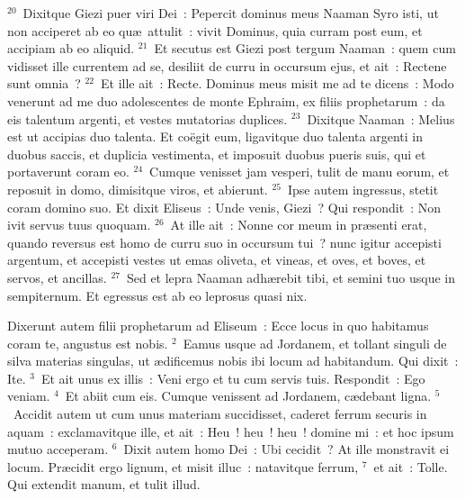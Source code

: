 ${}^{20}$~Dixitque Giezi puer viri Dei~: Pepercit dominus meus Naaman Syro isti, ut non acciperet ab eo qu\ae\ attulit~: vivit Dominus, quia curram post eum, et accipiam ab eo aliquid.
${}^{21}$~Et secutus est Giezi post tergum Naaman~: quem cum vidisset ille currentem ad se, desiliit de curru in occursum ejus, et ait~: Rectene sunt omnia~?
${}^{22}$~Et ille ait~: Recte. Dominus meus misit me ad te dicens~: Modo venerunt ad me duo adolescentes de monte Ephraim, ex filiis prophetarum~: da eis talentum argenti, et vestes mutatorias duplices.
${}^{23}$~Dixitque Naaman~: Melius est ut accipias duo talenta. Et co\"egit eum, ligavitque duo talenta argenti in duobus saccis, et duplicia vestimenta, et imposuit duobus pueris suis, qui et portaverunt coram eo.
${}^{24}$~Cumque venisset jam vesperi, tulit de manu eorum, et reposuit in domo, dimisitque viros, et abierunt.
${}^{25}$~Ipse autem ingressus, stetit coram domino suo. Et dixit Eliseus~: Unde venis, Giezi~? Qui respondit~: Non ivit servus tuus quoquam.
${}^{26}$~At ille ait~: Nonne cor meum in pr\ae senti erat, quando reversus est homo de curru suo in occursum tui~? nunc igitur accepisti argentum, et accepisti vestes ut emas oliveta, et vineas, et oves, et boves, et servos, et ancillas.
${}^{27}$~Sed et lepra Naaman adh\ae rebit tibi, et semini tuo usque in sempiternum. Et egressus est ab eo leprosus quasi nix.

\lettrine[lines=10,image=true,loversize=0.05,lraise=-0.03]{D}{}ixerunt autem filii prophetarum ad Eliseum~: Ecce locus in quo habitamus coram te, angustus est nobis.
${}^{2}$~Eamus usque ad Jordanem, et tollant singuli de silva materias singulas, ut \ae dificemus nobis ibi locum ad habitandum. Qui dixit~: Ite.
${}^{3}$~Et ait unus ex illis~: Veni ergo et tu cum servis tuis. Respondit~: Ego veniam.
${}^{4}$~Et abiit cum eis. Cumque venissent ad Jordanem, c\ae debant ligna.
${}^{5}$~Accidit autem ut cum unus materiam succidisset, caderet ferrum securis in aquam~: exclamavitque ille, et ait~: Heu~! heu~! heu~! domine mi~: et hoc ipsum mutuo acceperam.
${}^{6}$~Dixit autem homo Dei~: Ubi cecidit~? At ille monstravit ei locum. Pr\ae cidit ergo lignum, et misit illuc~: natavitque ferrum,
${}^{7}$~et ait~: Tolle. Qui extendit manum, et tulit illud.


